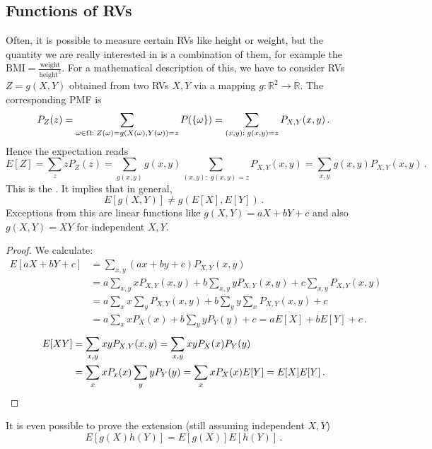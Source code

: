 	\subsection{Functions of RVs}
Often, it is possible to measure certain RVs like height or weight, but the quantity we are really interested in is a combination of them, for example the $\text{BMI} = \frac{\text{weight}}{\text{height}^2}$. For a mathematical description of this, we have to consider RVs $Z = g(X, Y)$ obtained from two RVs $X, Y$ via a mapping $g: \mathbb{R}^2 \rightarrow \mathbb{R}$. The corresponding PMF is
\begin{equation}
P_Z(z) = \sum_{\omega \in \Omega: \; Z(\omega) = g\qty(X(\omega), Y(\omega)) = z} P(\qty{\omega}) = \sum_{(x, y): \; g(x, y) = z} P_{X, Y}(x, y) \, .
\end{equation}
Hence the expectation reads
\begin{equation}
E[Z] = \sum_z z P_Z(z) = \sum_{g(x, y)} g(x, y) \sum_{(x, y): \; g(x, y) = z} P_{X, Y}(x, y) = \sum_{x, y} g(x, y) P_{X, Y}(x, y) \, .
\end{equation}
This is the . It implies that in general,
\begin{equation}
E[g(X, Y)] \neq g(E[X], E[Y]) \, .
\end{equation}
Exceptions from this are linear functions like $g(X, Y) = a X + b Y + c$ and also $g(X, Y) = X Y$ for independent $X, Y$.

\begin{proof}
We calculate:
\begin{align*}
E[a X + b Y + c] &= \sum_{x, y} (a x + b y + c) P_{X, Y}(x, y)
\\
&= a \sum_{x, y} x P_{X, Y}(x, y) + b \sum_{x, y} y P_{X, Y}(x, y) + c \sum_{x, y} P_{X, Y}(x, y)
\\
&= a \sum_x x \sum_y P_{X, Y}(x, y) + b \sum_y y \sum_x P_{X, Y}(x, y) + c
\\
&= a \sum_x x P_X(x) + b \sum_y y P_Y(y) + c = a E[X] + b E[Y] + c \, .
\end{align*}
%
\begin{align*}
E[X Y] &= \sum_{x, y} x y P_{X, Y}(x, y) = \sum_{x, y} x y P_X(x) P_Y(y) 
\\
&= \sum_x x P_x(x) \sum_y y P_Y(y) = \sum_x x P_X(x) E[Y] = E[X] E[Y] \, .\qedhere
\end{align*}
\end{proof}

It is even possible to prove the extension (still assuming independent $X, Y$)
\begin{equation}
E[g(X) h(Y)] = E[g(X)] E[h(Y)] \,. 
\end{equation}


